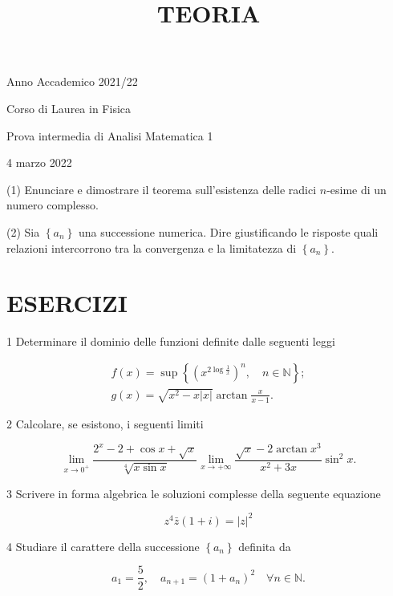 \documentclass[10pt]{article}
\title{TEORIA }
\author{}
\date{}
\begin{document}
\maketitle
Anno Accademico 2021/22

Corso di Laurea in Fisica

Prova intermedia di Analisi Matematica 1

4 marzo 2022

(1) Enunciare e dimostrare il teorema sull'esistenza delle radici \(n\)-esime di un numero complesso.

(2) Sia \(\left\{a_{n}\right\}\) una successione numerica. Dire giustificando le risposte quali relazioni intercorrono tra la convergenza e la limitatezza di \(\left\{a_{n}\right\}\).

\section{ESERCIZI}
1 Determinare il dominio delle funzioni definite dalle seguenti leggi

\[
\begin{gathered}
f(x)=\sup \left\{\left(x^{2 \log \frac{1}{x}}\right)^{n}, \quad n \in \mathbb{N}\right\} ; \\
g(x)=\sqrt{x^{2}-x|x|} \arctan \frac{x}{x-1} .
\end{gathered}
\]

2 Calcolare, se esistono, i seguenti limiti

\[
\lim _{x \rightarrow 0^{+}} \frac{2^{x}-2+\cos x+\sqrt{x}}{\sqrt[4]{x \sin x}} \lim _{x \rightarrow+\infty} \frac{\sqrt{x}-2 \arctan x^{3}}{x^{2}+3 x} \sin ^{2} x .
\]

3 Scrivere in forma algebrica le soluzioni complesse della seguente equazione

\[
z^{4} \bar{z}(1+i)=|z|^{2}
\]

4 Studiare il carattere della successione \(\left\{a_{n}\right\}\) definita da

\[
a_{1}=\frac{5}{2}, \quad a_{n+1}=\left(1+a_{n}\right)^{2} \quad \forall n \in \mathbb{N} .
\]
\end{document}
